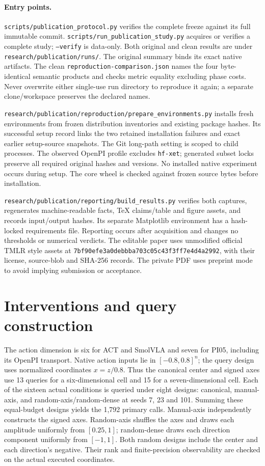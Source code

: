 \paragraph{Entry points.}
\texttt{scripts/publication\_protocol.py} verifies the complete freeze against its full immutable commit. \texttt{scripts/run\_publication\_study.py} acquires or verifies a complete study; \texttt{--verify} is data-only. Both original and clean results are under \texttt{research/publication/runs/}. The original summary binds its exact native artifacts. The clean \texttt{reproduction-comparison.json} names the four byte-identical semantic products and checks metric equality excluding phase costs. Never overwrite either single-use run directory to reproduce it again; a separate clone/workspace preserves the declared names.

\texttt{research/publication/reproduction/prepare\_environments.py} installs fresh environments from frozen distribution inventories and existing package hashes. Its successful setup record links the two retained installation failures and exact earlier setup-source snapshots. The Git long-path setting is scoped to child processes. The observed OpenPI profile excludes \texttt{hf-xet}; generated subset locks preserve all required original hashes and versions. No installed native experiment occurs during setup. The core wheel is checked against frozen source bytes before installation.

\texttt{research/publication/reporting/build\_results.py} verifies both captures, regenerates machine-readable facts, TeX claims/table and figure assets, and records input/output hashes. Its separate Matplotlib environment has a hash-locked requirements file. Reporting occurs after acquisition and changes no thresholds or numerical verdicts. The editable paper uses unmodified official TMLR style assets at \texttt{7bf90efe3a0debbba703c05c43f3ff7e4d4a2992}, with their license, source-blob and SHA-256 records. The private PDF uses preprint mode to avoid implying submission or acceptance.

\section{Interventions and query construction}\label{app:recipes}
The action dimension is six for ACT and SmolVLA and seven for PI05, including its OpenPI transport. Native action inputs lie in $[-0.8,0.8]^n$; the query design uses normalized coordinates $x=z/0.8$. Thus the canonical center and signed axes use 13 queries for a six-dimensional cell and 15 for a seven-dimensional cell. Each of the sixteen actual conditions is queried under eight designs: canonical, manual-axis, and random-axis/random-dense at seeds 7, 23 and 101. Summing these equal-budget designs yields the 1,792 primary calls. Manual-axis independently constructs the signed axes. Random-axis shuffles the axes and draws each amplitude uniformly from $[0.25,1]$; random-dense draws each direction component uniformly from $[-1,1]$. Both random designs include the center and each direction's negative. Their rank and finite-precision observability are checked on the actual executed coordinates.

